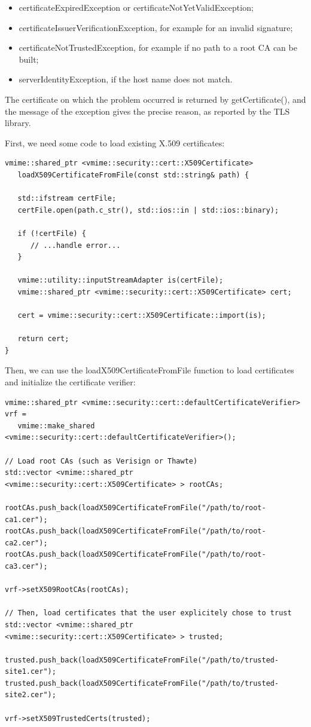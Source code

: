 \begin{itemize}
\item {\vcode certificateExpiredException} or
{\vcode certificateNotYetValidException};
\item {\vcode certificateIssuerVerificationException}, for example for an
invalid signature;
\item {\vcode certificateNotTrustedException}, for example if no path to a root
CA can be built;
\item {\vcode serverIdentityException}, if the host name does not match.
\end{itemize}

The certificate on which the problem occurred is returned by
{\vcode getCertificate()}, and the message of the exception gives the precise
reason, as reported by the TLS library.

First, we need some code to load existing X.509 certificates:

\begin{lstlisting}[caption={Reading a X.509 certificate from a file}]
vmime::shared_ptr <vmime::security::cert::X509Certificate>
   loadX509CertificateFromFile(const std::string& path) {

   std::ifstream certFile;
   certFile.open(path.c_str(), std::ios::in | std::ios::binary);

   if (!certFile) {
      // ...handle error...
   }

   vmime::utility::inputStreamAdapter is(certFile);
   vmime::shared_ptr <vmime::security::cert::X509Certificate> cert;

   cert = vmime::security::cert::X509Certificate::import(is);

   return cert;
}
\end{lstlisting}

Then, we can use the {\vcode loadX509CertificateFromFile} function to load
certificates and initialize the certificate verifier:

\begin{lstlisting}[caption={Using the default certificate verifier}]
vmime::shared_ptr <vmime::security::cert::defaultCertificateVerifier> vrf =
   vmime::make_shared <vmime::security::cert::defaultCertificateVerifier>();

// Load root CAs (such as Verisign or Thawte)
std::vector <vmime::shared_ptr <vmime::security::cert::X509Certificate> > rootCAs;

rootCAs.push_back(loadX509CertificateFromFile("/path/to/root-ca1.cer");
rootCAs.push_back(loadX509CertificateFromFile("/path/to/root-ca2.cer");
rootCAs.push_back(loadX509CertificateFromFile("/path/to/root-ca3.cer");

vrf->setX509RootCAs(rootCAs);

// Then, load certificates that the user explicitely chose to trust
std::vector <vmime::shared_ptr <vmime::security::cert::X509Certificate> > trusted;

trusted.push_back(loadX509CertificateFromFile("/path/to/trusted-site1.cer");
trusted.push_back(loadX509CertificateFromFile("/path/to/trusted-site2.cer");

vrf->setX509TrustedCerts(trusted);
\end{lstlisting}


